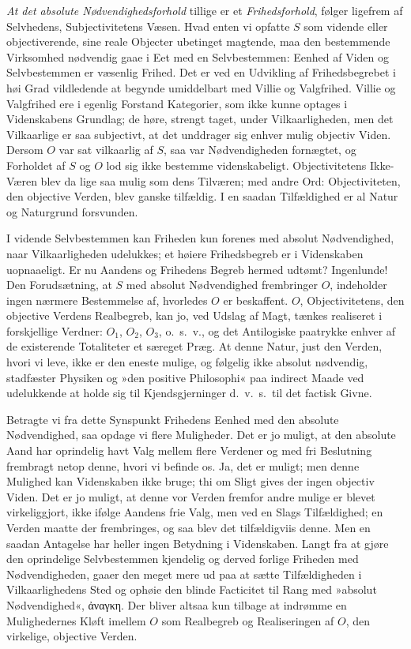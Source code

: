 \documentclass[12pt]{book}
\newcommand{\apage}[1]{\marginnote{\footnotesize\textit{[#1]}}}
\begin{document}
\emph{At det absolute Nødvendighedsforhold} tillige er et \emph{Frihedsforhold}, følger
ligefrem af Selvhedens, Subjectivitetens Væsen. Hvad enten vi opfatte $S$
som vidende eller objectiverende, sine reale Objecter ubetinget magtende,
maa den bestemmende Virksomhed nødvendig gaae i Eet med en Selvbestemmen:
Eenhed af Viden og Selvbestemmen er væsenlig Frihed. Det er ved en Udvikling
af Frihedsbegrebet i høi Grad vildledende at begynde umiddelbart med Villie
og Valgfrihed. Villie og Valgfrihed ere i egenlig Forstand Kategorier, som
ikke kunne optages i Videnskabens Grundlag; de høre, strengt taget, under
Vilkaarligheden, men det Vilkaarlige er saa subjectivt, at det unddrager
sig enhver mulig objectiv Viden. Dersom $O$ var sat vilkaarlig af $S$, saa
var Nødvendigheden fornægtet, og Forholdet af $S$ og $O$ lod sig ikke
bestemme videnskabeligt. Objectivitetens Ikke-Væren blev da lige saa mulig
som dens Tilværen; med andre Ord: Objectiviteten, den objective Verden,
blev ganske \apage{226} tilfældig. I en saadan Tilfældighed er al Natur og Naturgrund
forsvunden.

I vidende Selvbestemmen kan Friheden kun forenes med absolut Nødvendighed,
naar Vilkaarligheden udelukkes; et høiere Frihedsbegreb er i Videnskaben
uopnaaeligt. Er nu Aandens og Frihedens Begreb hermed udtømt? Ingenlunde!
Den Forudsætning, at $S$ med absolut Nødvendighed frembringer $O$, indeholder
ingen nærmere Bestemmelse af, hvorledes $O$ er beskaffent. $O$,
Objectivitetens, den objective Verdens Realbegreb, kan jo, ved Udslag af
Magt, tænkes realiseret i forskjellige Verdner: $O_1$, $O_2$, $O_3$, o.\ s.\ v.,
og det Antilogiske paatrykke enhver af de existerende Totaliteter et
særeget Præg. At denne Natur, just den Verden, hvori vi leve, ikke er den
eneste mulige, og følgelig ikke absolut nødvendig, stadfæster Physiken og
»den positive Philosophi« paa indirect Maade ved udelukkende at holde sig
til Kjendsgjerninger d.\ v.\ s.\ til det factisk Givne.

Betragte vi fra dette Synspunkt Frihedens Eenhed med den absolute
Nødvendighed, saa opdage vi flere Muligheder. Det er jo muligt, at den
absolute Aand har oprindelig havt Valg mellem flere Verdener og med fri
Beslutning frembragt netop denne, hvori vi befinde os. Ja, det er muligt;
men denne Mulighed kan Videnskaben ikke bruge; thi om Sligt gives der ingen
objectiv Viden. Det er jo muligt, at denne vor Verden fremfor andre mulige
er blevet virkeliggjort, ikke ifølge Aandens frie Valg, men ved en Slags
Tilfældighed; en Verden maatte der frembringes, og saa \apage{227} blev det
tilfældigviis denne. Men en saadan Antagelse har heller ingen Betydning i
Videnskaben. Langt fra at gjøre den oprindelige Selvbestemmen kjendelig og
derved forlige Friheden med Nødvendigheden, gaaer den meget mere ud paa at
sætte Tilfældigheden i Vilkaarlighedens Sted og ophøie den blinde Facticitet
til Rang med »absolut Nødvendighed«, ἀναγκη. Der bliver altsaa kun tilbage
at indrømme en Mulighedernes Kløft imellem $O$ som Realbegreb og
Realiseringen af $O$, den virkelige, objective Verden.
\end{document}
